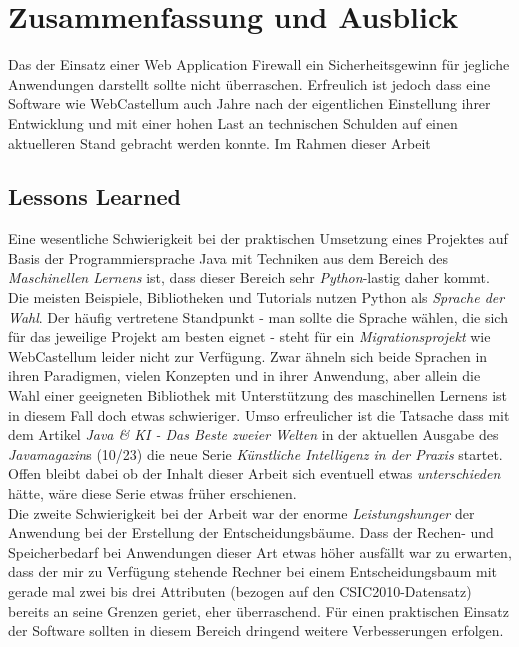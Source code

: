 \chapter{Zusammenfassung und Ausblick}



Das der Einsatz einer Web Application Firewall ein Sicherheitsgewinn für jegliche Anwendungen darstellt sollte nicht überraschen. Erfreulich ist jedoch dass eine Software wie WebCastellum auch Jahre nach der eigentlichen Einstellung ihrer Entwicklung und mit einer hohen Last an technischen Schulden auf einen aktuelleren Stand gebracht werden konnte. Im Rahmen dieser Arbeit 

\section{Lessons Learned}
Eine wesentliche Schwierigkeit bei der praktischen Umsetzung eines Projektes auf Basis der Programmiersprache Java mit Techniken aus dem Bereich des \emph{Maschinellen Lernens} ist, dass dieser Bereich sehr \glqq\emph{Python}\grqq-lastig daher kommt. Die meisten Beispiele, Bibliotheken und Tutorials nutzen Python als \emph{Sprache der Wahl}. Der häufig vertretene Standpunkt - man sollte die Sprache wählen, die sich für das jeweilige Projekt am besten eignet - steht für ein \emph{Migrationsprojekt} wie WebCastellum leider nicht zur Verfügung. Zwar ähneln sich beide Sprachen in ihren Paradigmen, vielen Konzepten und in ihrer Anwendung, aber allein die Wahl einer geeigneten Bibliothek mit Unterstützung des maschinellen Lernens ist in diesem Fall doch etwas schwieriger. Umso erfreulicher ist die Tatsache dass mit dem Artikel \glqq\emph{Java \& KI - Das Beste zweier Welten}\grqq{} in der aktuellen Ausgabe des \emph{Javamagazin}s (10/23) die neue Serie \glqq\emph{Künstliche Intelligenz in der Praxis}\grqq{} startet. Offen bleibt dabei ob der Inhalt dieser Arbeit sich eventuell etwas \emph{unterschieden} hätte, wäre diese Serie etwas früher erschienen.\\

Die zweite Schwierigkeit bei der Arbeit war der enorme \emph{Leistungshunger} der Anwendung bei der Erstellung der Entscheidungsbäume. Dass der Rechen- und Speicherbedarf bei Anwendungen dieser Art etwas höher ausfällt war zu erwarten, dass der mir zu Verfügung stehende Rechner bei einem Entscheidungsbaum mit gerade mal zwei bis drei Attributen (bezogen auf den CSIC2010-Datensatz) bereits an seine Grenzen geriet, eher überraschend. Für einen praktischen Einsatz der Software sollten in diesem Bereich dringend weitere Verbesserungen erfolgen.\\

